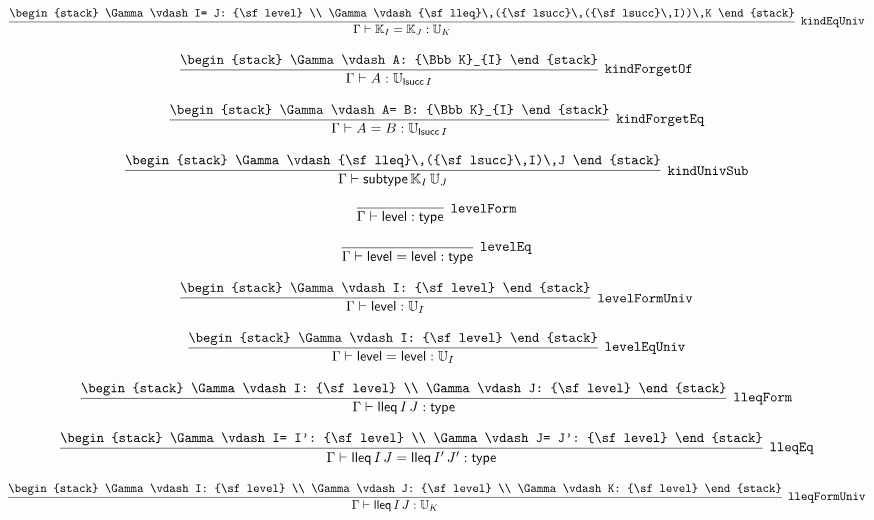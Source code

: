 \[
\infer[{\tt kindEqUniv}]{\Gamma \vdash {\Bbb K}_{I}= {\Bbb K}_{J}: {\Bbb U}_{K}}{
\begin{stack}
\Gamma \vdash I= J: {\sf level}
\\
\Gamma \vdash {\sf lleq}\,({\sf lsucc}\,({\sf lsucc}\,I))\,K
\end{stack}}
\]

\[
\infer[{\tt kindForgetOf}]{\Gamma \vdash A: {\Bbb U}_{{\sf lsucc}\,I}}{
\begin{stack}
\Gamma \vdash A: {\Bbb K}_{I}
\end{stack}}
\]

\[
\infer[{\tt kindForgetEq}]{\Gamma \vdash A= B: {\Bbb U}_{{\sf lsucc}\,I}}{
\begin{stack}
\Gamma \vdash A= B: {\Bbb K}_{I}
\end{stack}}
\]

\[
\infer[{\tt kindUnivSub}]{\Gamma \vdash {\sf subtype}\,{\Bbb K}_{I}\,{\Bbb U}_{J}}{
\begin{stack}
\Gamma \vdash {\sf lleq}\,({\sf lsucc}\,I)\,J
\end{stack}}
\]

\[
\infer[{\tt levelForm}]{\Gamma \vdash {\sf level}: {\sf type}}{}
\]

\[
\infer[{\tt levelEq}]{\Gamma \vdash {\sf level}= {\sf level}: {\sf type}}{}
\]

\[
\infer[{\tt levelFormUniv}]{\Gamma \vdash {\sf level}: {\Bbb U}_{I}}{
\begin{stack}
\Gamma \vdash I: {\sf level}
\end{stack}}
\]

\[
\infer[{\tt levelEqUniv}]{\Gamma \vdash {\sf level}= {\sf level}: {\Bbb U}_{I}}{
\begin{stack}
\Gamma \vdash I: {\sf level}
\end{stack}}
\]

\[
\infer[{\tt lleqForm}]{\Gamma \vdash {\sf lleq}\,I\,J: {\sf type}}{
\begin{stack}
\Gamma \vdash I: {\sf level}
\\
\Gamma \vdash J: {\sf level}
\end{stack}}
\]

\[
\infer[{\tt lleqEq}]{\Gamma \vdash {\sf lleq}\,I\,J= {\sf lleq}\,I'\,J': {\sf type}}{
\begin{stack}
\Gamma \vdash I= I': {\sf level}
\\
\Gamma \vdash J= J': {\sf level}
\end{stack}}
\]

\[
\infer[{\tt lleqFormUniv}]{\Gamma \vdash {\sf lleq}\,I\,J: {\Bbb U}_{K}}{
\begin{stack}
\Gamma \vdash I: {\sf level}
\\
\Gamma \vdash J: {\sf level}
\\
\Gamma \vdash K: {\sf level}
\end{stack}}
\]

